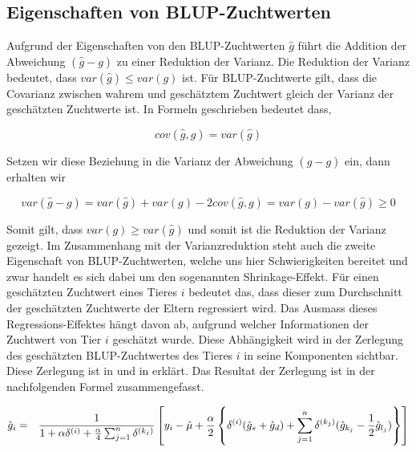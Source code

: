\documentclass[]{book}
\begin{document}
\subsection{Eigenschaften von
BLUP-Zuchtwerten}\label{eigenschaften-von-blup-zuchtwerten}

Aufgrund der Eigenschaften von den BLUP-Zuchtwerten \(\hat{g}\) führt
die Addition der Abweichung \((\hat{g} - g)\) zu einer Reduktion der
Varianz. Die Reduktion der Varianz bedeutet, dass
\(var(\hat{g}) \le var(g)\) ist. Für BLUP-Zuchtwerte gilt, dass die
Covarianz zwischen wahrem und geschätztem Zuchtwert gleich der Varianz
der geschätzten Zuchtwerte ist. In Formeln geschrieben bedeutet dass,

\begin{equation}
  cov(\hat{g},g) = var(\hat{g})
\end{equation}

Setzen wir diese Beziehung in die Varianz der Abweichung
\((\hat{g} - g)\) ein, dann erhalten wir

\begin{equation}
  var(\hat{g} - g) = var(\hat{g}) + var(g) - 2cov(\hat{g},g) = var(g) - var(\hat{g}) \ge 0
\end{equation}

Somit gilt, dass \(var(g) \ge var(\hat{g})\) und somit ist die Reduktion
der Varianz gezeigt. Im Zusammenhang mit der Varianzreduktion steht auch
die zweite Eigenschaft von BLUP-Zuchtwerten, welche uns hier
Schwierigkeiten bereitet und zwar handelt es sich dabei um den
sogenannten Shrinkage-Effekt. Für einen geschätzten Zuchtwert eines
Tieres \(i\) bedeutet das, dass dieser zum Durchschnitt der geschätzten
Zuchtwerte der Eltern regressiert wird. Das Ausmass dieses
Regressions-Effektes hängt davon ab, aufgrund welcher Informationen der
Zuchtwert von Tier \(i\) geschätzt wurde. Diese Abhängigkeit wird in der
Zerlegung des geschätzten BLUP-Zuchtwertes des Tieres \(i\) in seine
Komponenten sichtbar. Diese Zerlegung ist in \citep{Hofer1990} und in
\citep{vonRohr2016} erklärt. Das Resultat der Zerlegung ist in der
nachfolgenden Formel zusammengefasst.

\begin{eqnarray}
\hat{g}_i &=& \frac{1}{1 + \alpha \delta^{(i)} + {\alpha\over 4} \sum_{j=1}^n \delta^{(k_j)}}
              \left[y_i - \hat{\mu} + {\alpha\over 2}\left\{\delta^{(i)}(\hat{g}_s + \hat{g}_d) 
              + \sum_{j=1}^n \delta^{(k_j)} (\hat{g}_{k_j} - {1\over 2}\hat{g}_{l_j}) \right\} \right]
\label{eq:AhatDecompEq}
\end{eqnarray}
\end{document}
